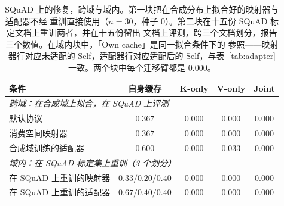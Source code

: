 \documentclass[11pt]{article}
\begin{document}
\begin{table}[t]
\centering
\small
\caption{SQuAD 上的修复，跨域与域内。第一块把在合成分布上拟合好的映射器与适配器不经
重训直接使用（$n=30$，种子 0）。第二块在十五份 SQuAD 标定文档上重训两者，并在十五份留出
文档上评测，跨三个文档划分，报告三个数值。在域内块中，「Own cache」是同一拟合条件下的
参照——映射器行对应未适配的 Self，适配器行对应适配后的 Self，与表~\ref{tab:adapter} 
一致。两个块中每个迁移臂都是 $0.000$。}
\label{tab:squadrepair}
\begin{tabular}{lcccc}
\toprule
条件 & 自身缓存 & K-only & V-only & Joint \\
\midrule
\multicolumn{5}{l}{\emph{跨域：在合成域上拟合，在 SQuAD 上评测}}\\
默认协议              & $0.367$ & $0.000$ & $0.000$ & $0.000$ \\
消费空间映射器      & $0.367$ & $0.000$ & $0.000$ & $0.000$ \\
合成域训练的适配器     & $0.600$ & $0.000$ & $0.033$ & $0.000$ \\
\midrule
\multicolumn{5}{l}{\emph{域内：在 SQuAD 标定集上重训（3 个划分）}}\\
在 SQuAD 上重训的映射器      & $0.33/0.20/0.40$ & $0.000$ & $0.000$ & $0.000$ \\
在 SQuAD 上重训的适配器     & $0.67/0.40/0.40$ & $0.000$ & $0.000$ & $0.000$ \\
\bottomrule
\end{tabular}
\end{table}
\end{document}
